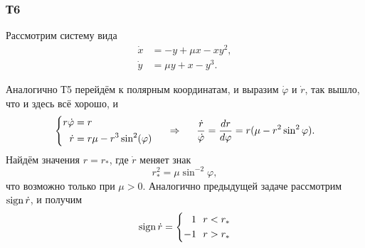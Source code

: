 \subsubsection*{Т6}

Рассмотрим систему вида
\begin{align*}
    \dot{x} &= - y + \mu x - x y^2,\\
    \dot{y} &= \mu y + x - y^3.
\end{align*}



Аналогично Т5 перейдём к полярным координатам, и выразим $\dot{\varphi}$ и $\dot{r}$, так вышло, что и здесь всё хорошо, и
\begin{equation*}
    \left\{\begin{aligned}
        r \dot{\varphi} &= r \\
        \dot{r} &= r \mu - r^3 \sin^2 (\varphi)
    \end{aligned}\right.
    \hspace{0.5cm} \Rightarrow \hspace{0.5cm}
    \frac{\dot{r}}{\dot{\varphi}} = \frac{d r}{d \varphi} = 
    r (\mu - r^2 \sin^2 \varphi).
\end{equation*}
Найдём значения $r = r_*$, где $\dot{r}$ меняет знак
\begin{equation*}
    r_*^2 = \mu \sin^{-2} \varphi,
\end{equation*}
что возможно только при $\mu > 0$. Аналогично предыдущей задаче рассмотрим $\mathop{\mathrm{sign}}\nolimits \dot{r}$, и получим
\begin{equation*}
    \mathop{\mathrm{sign}}\nolimits \dot{r} = 
    \left\{\begin{aligned}
        1 & \ \  r < r_*   \\
        -1 & \ \ r > r_*
    \end{aligned}\right.
\end{equation*}

